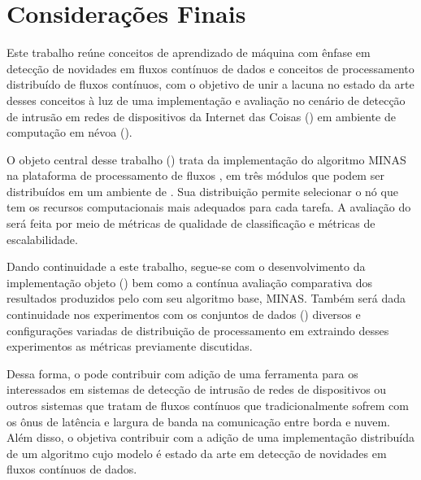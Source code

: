\chapter{Considerações Finais}\label{cha:final}


Este trabalho reúne conceitos de aprendizado de máquina com ênfase em detecção
de novidades em fluxos contínuos de dados e conceitos de processamento
distribuído de fluxos contínuos, com o objetivo de unir a lacuna no estado da
arte desses conceitos à luz de uma implementação e avaliação no cenário de
detecção de intrusão em redes de dispositivos da Internet das Coisas (\iot) em
ambiente de computação em névoa (\fog).

O objeto central desse trabalho (\mfog) trata da implementação do algoritmo MINAS na
plataforma de processamento de fluxos \flink, em três módulos que podem ser
distribuídos em um ambiente de \fog.
Sua distribuição permite selecionar o nó que tem os recursos computacionais mais
adequados para cada tarefa.
A avaliação do \mfog será feita por
meio de métricas de qualidade
de classificação e métricas de escalabilidade.

Dando continuidade a este trabalho, segue-se com o desenvolvimento da implementação objeto
(\mfog) bem como a contínua avaliação comparativa dos resultados
produzidos pelo \mfog com seu algoritmo base, MINAS.
Também será dada continuidade nos experimentos com os conjuntos de dados (\datasets)
diversos e configurações variadas de distribuição de processamento em \fog
extraindo desses experimentos as métricas previamente discutidas.

Dessa forma, o \mfog pode contribuir com adição de uma ferramenta para os interessados
em sistemas de detecção de intrusão de redes de dispositivos \iot
ou outros sistemas que tratam de fluxos contínuos que tradicionalmente sofrem
com os ônus de latência e largura de banda na comunicação entre borda e nuvem.
Além disso, o \mfog objetiva contribuir com a adição de uma implementação
distribuída de um algoritmo cujo modelo é estado da arte em detecção de
novidades em fluxos contínuos de dados.
